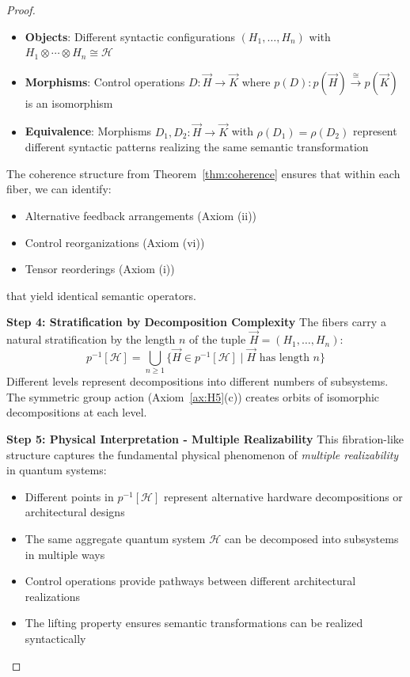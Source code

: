 \documentclass[11pt]{article}
\begin{document}
\begin{proof}
\begin{itemize}
    \item \textbf{Objects}: Different syntactic configurations $(H_1, \dots, H_n)$ with $H_1 \otimes \cdots \otimes H_n \cong \mathcal{H}$
    \item \textbf{Morphisms}: Control operations $D: \vec{H} \to \vec{K}$ where $p(D): p(\vec{H}) \xrightarrow{\cong} p(\vec{K})$ is an isomorphism
    \item \textbf{Equivalence}: Morphisms $D_1, D_2: \vec{H} \to \vec{K}$ with $\rho(D_1) = \rho(D_2)$ represent different syntactic patterns realizing the same semantic transformation
\end{itemize}

The coherence structure from Theorem~\ref{thm:coherence} ensures that within each fiber, we can identify:
\begin{itemize}
    \item Alternative feedback arrangements (Axiom (ii))
    \item Control reorganizations (Axiom (vi)) 
    \item Tensor reorderings (Axiom (i))
\end{itemize}
that yield identical semantic operators.

\noindent\textbf{Step 4: Stratification by Decomposition Complexity}
The fibers carry a natural stratification by the length $n$ of the tuple $\vec{H} = (H_1, \dots, H_n)$:
\[
p^{-1}[\mathcal{H}] = \bigcup_{n \geq 1} \{\vec{H} \in p^{-1}[\mathcal{H}] \mid \vec{H} \text{ has length } n\}
\]
Different levels represent decompositions into different numbers of subsystems. The symmetric group action (Axiom~\ref{ax:H5}(c)) creates orbits of isomorphic decompositions at each level.

\noindent\textbf{Step 5: Physical Interpretation - Multiple Realizability}
This fibration-like structure captures the fundamental physical phenomenon of \emph{multiple realizability} in quantum systems:
\begin{itemize}
    \item Different points in $p^{-1}[\mathcal{H}]$ represent alternative hardware decompositions or architectural designs
    \item The same aggregate quantum system $\mathcal{H}$ can be decomposed into subsystems in multiple ways
    \item Control operations provide pathways between different architectural realizations
    \item The lifting property ensures semantic transformations can be realized syntactically
\end{itemize}


\end{proof}
\end{document}
